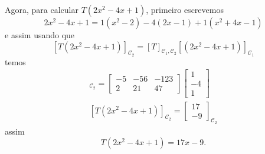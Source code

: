 \begin{exemplos}
\begin{enumerate}[label={\arabic*})]
\begin{solucao}
      Agora, para calcular $T(2x^2 - 4x + 1)$, primeiro escrevemos
      \[
        2x^2 - 4x + 1 = 1(x^2 - 2) - 4(2x - 1) + 1(x^2 + 4x - 1)
      \]
      e assim usando que
      \[
        [T(2x^2 - 4x + 1)]_{\mathcal{C}_2} = [T]_{\mathcal{C}_1, \mathcal{C}_2}[(2x^2 - 4x + 1)]_{\mathcal{C}_1}
      \]
      temos
      \begin{align*}
        [T(2x^2 - 4x + 1)]_{\mathcal{C}_2} = \begin{bmatrix}-5 & -56 & -123\\2 & 21 & 47\end{bmatrix}\begin{bmatrix}1 \\ -4\\1\end{bmatrix}\\
        [T(2x^2 - 4x + 1)]_{\mathcal{C}_2} = \begin{bmatrix}17 \\ -9\end{bmatrix}_{\mathcal{C}_2}
      \end{align*}
      assim
      \[
        T(2x^2 - 4x + 1) = 17x - 9.
      \]
    \end{solucao}


\end{enumerate}
\end{exemplos}
